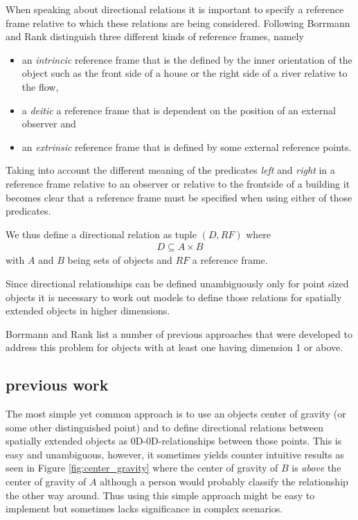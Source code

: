 \documentclass[paper=a4, fontsize=11pt]{scrartcl} %
\numberwithin{equation}{section} %
\numberwithin{figure}{section} %
\numberwithin{table}{section} %
\begin{document}
When speaking about directional relations it is important to specify a reference frame relative to which these relations are being considered. Following \cite{Retz-Schmidt:1988:VVS:46184.46189} Borrmann and Rank \cite{Borrmann:2009:AEI} distinguish three different kinds of reference frames, namely
\begin{itemize}
\item an \emph{intrincic} reference frame that is the defined by the inner orientation of the object such as the front side of a house or the right side of a river relative to the flow,
\item a \emph{deitic} a reference frame that is dependent on the position of an external observer and 
\item an \emph{extrinsic} reference frame that is defined by some external reference points. 
\end{itemize}

Taking into account the different meaning of the predicates \emph{left} and \emph{right} in a reference frame relative to an observer or relative to the frontside of a building it becomes clear that a reference frame must be specified when using either of those predicates.

We thus define a directional relation as tuple $(D,RF)$ where  
\begin{align*}
 D \subseteq A \times B 
\end{align*}
with $A$ and $B$ being sets of objects and $RF$ a reference frame.

Since directional relationships can be defined unambiguously only for point sized objects it is necessary to work out models to define those relations for spatially extended objects in higher dimensions. 

Borrmann and Rank \cite{Borrmann:2009:AEI} list a number of previous approaches that were developed to address this problem for objects with at least one having dimension 1 or above.

\subsection{previous work}
The most simple yet common approach is to use an objects center of gravity (or some other distinguished point) and to define directional relations between spatially extended objects as 0D-0D-relationships between those points. This is easy and unambiguous, however, it sometimes yields counter intuitive results as seen in Figure \ref{fig:center_gravity} where the center of gravity of $B$ is \emph{above} the center of gravity of $A$ although a person would probably classify the relationship the other way around. Thus using this simple approach might be easy to implement but sometimes lacks significance in complex scenarios.
\end{document}
